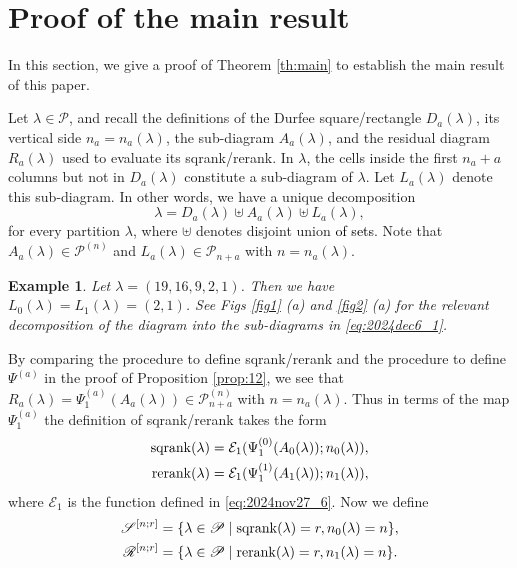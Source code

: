 \documentclass[sn-mathphys-num]{sn-jnl}%
\newcommand{\red}[1]{\textcolor{black}{#1}}
\theoremstyle{thmstyleone}%
\theoremstyle{thmstyletwo}%
\newtheorem{example}{Example}%
\theoremstyle{thmstylethree}%
\begin{document}
\section{Proof of the main result}\label{sec7}
In this section, we give a proof of Theorem \ref{th:main} to establish the main
result of this paper.

Let $\lambda \in \mathscr{P}$, and recall the definitions of 
the Durfee square/rectangle $D_a(\lambda)$, 
its vertical side $n_a =n_a(\lambda)$,
the sub-diagram $A_a(\lambda)$,
and the residual diagram $R_a(\lambda)$ used to
evaluate its sqrank/rerank.
%
In $\lambda$,
the cells inside the first $n_a + a$ columns but not in $D_a(\lambda)$ constitute a sub-diagram 
of $\lambda$. Let $L_a(\lambda)$ denote this sub-diagram.
In other words, we have a unique decomposition
\begin{equation}\label{eq:2024dec6_1}
\lambda = D_a(\lambda) \uplus A_a(\lambda) \uplus L_a(\lambda),
\end{equation}
for every partition $\lambda$, where $\uplus$ denotes disjoint union \red{of sets}.
Note that $A_a(\lambda) \in \mathscr{P}^{(n)}$ and
$L_a(\lambda) \in \mathscr{P}_{n+a}$
with $n = n_a(\lambda)$.

\begin{example}
Let $\lambda = (19,16,9,2,1)$.
Then we have 
$L_0(\lambda)=L_1(\lambda)=(2,1)$.
See Figs \ref{fig1} (a) and \ref{fig2} (a) for the relevant decomposition of the diagram into
the sub-diagrams in \eqref{eq:2024dec6_1}.
\end{example}



By comparing the procedure to define sqrank/rerank and
the procedure to define $\Psi^{(a)}$ in the proof of Proposition \ref{prop:12},
we see that $R_a(\lambda) = \Psi^{(a)}_1(A_a(\lambda)) \in \mathscr{P}^{(n)}_{n+a}$ with $n = n_a(\lambda)$.
Thus in terms of the map $\Psi^{(a)}_1$ the definition of sqrank/rerank takes the form
\begin{align}
{\rm sqrank} (\lambda) &= \mathcal{E}_1 ( \Psi^{(0)}_1(A_0(\lambda)); n_0(\lambda)), \\
{\rm rerank} (\lambda) &= \mathcal{E}_1 ( \Psi^{(1)}_1(A_1(\lambda)); n_1(\lambda)), 
\end{align}
where $\mathcal{E}_1$ is the function defined in \eqref{eq:2024nov27_6}.
Now we define
\begin{align}
\mathscr{S}^{[n;r]} &= \{ \lambda \in \mathscr{P} \mid {\rm sqrank} (\lambda) =r, 
n_0(\lambda) =n \}, \\
\mathscr{R}^{[n;r]} &= \{ \lambda \in \mathscr{P} \mid {\rm rerank} (\lambda) =r, 
n_1(\lambda) =n \}.
\end{align}
\end{document}

